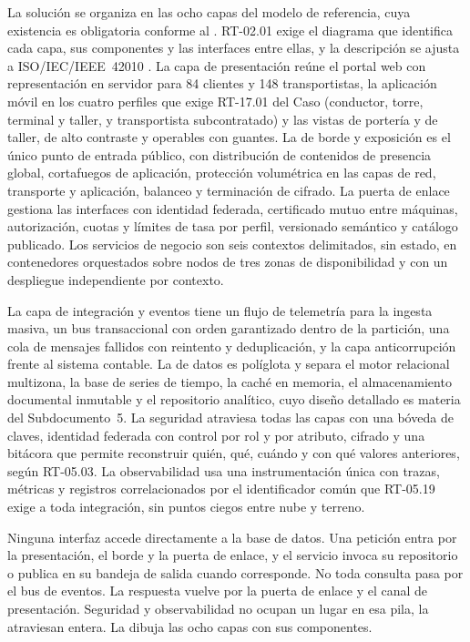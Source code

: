 La solución se organiza en las ocho capas del modelo de referencia, cuya existencia es obligatoria
conforme al . RT-02.01 exige el diagrama que identifica cada capa, sus
componentes y las interfaces entre ellas, y la descripción se ajusta a ISO/IEC/IEEE~42010
\parencite{iso42010}. La capa de presentación reúne el portal web con representación en servidor para
84 clientes y 148 transportistas, la aplicación móvil en los cuatro perfiles que exige RT-17.01 del Caso
(conductor, torre, terminal y taller, y transportista subcontratado) y las vistas de portería y de
taller, de alto contraste y operables con guantes. La de borde y exposición es el único punto de entrada
público, con distribución de contenidos de presencia global, cortafuegos de aplicación, protección
volumétrica en las capas de red, transporte y aplicación, balanceo y terminación de cifrado. La puerta
de enlace gestiona las interfaces con identidad federada, certificado mutuo entre máquinas,
autorización, cuotas y límites de tasa por perfil, versionado semántico y catálogo publicado. Los
servicios de negocio son seis contextos delimitados, sin estado, en contenedores orquestados sobre
nodos de tres zonas de disponibilidad y con un despliegue independiente por contexto.

La capa de integración y eventos tiene un flujo de telemetría para la ingesta masiva, un bus
transaccional con orden garantizado dentro de la partición, una cola de mensajes fallidos con reintento
y deduplicación, y la capa anticorrupción frente al sistema contable. La de datos es políglota y separa
el motor relacional multizona, la base de series de tiempo, la caché en memoria, el almacenamiento
documental inmutable y el repositorio analítico, cuyo diseño detallado es materia del Subdocumento~5. La
seguridad atraviesa todas las capas con una bóveda de claves, identidad federada con control por rol y
por atributo, cifrado y una bitácora que permite reconstruir quién, qué, cuándo y con qué valores
anteriores, según RT-05.03. La observabilidad usa una instrumentación única con trazas, métricas y
registros correlacionados por el identificador común que RT-05.19 exige a toda integración, sin puntos
ciegos entre nube y terreno.

Ninguna interfaz accede directamente a la base de datos. Una petición entra por la presentación, el
borde y la puerta de enlace, y el servicio invoca su repositorio o publica en su bandeja de salida
cuando corresponde. No toda consulta pasa por el bus de eventos. La respuesta vuelve por la puerta de
enlace y el canal de presentación. Seguridad y observabilidad no ocupan un lugar en esa pila, la
atraviesan entera. La  dibuja las ocho capas con sus componentes.

